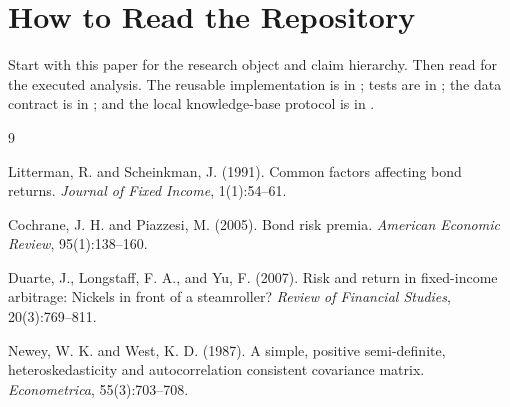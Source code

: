 \documentclass[12pt]{article}
\begin{document}
\section{How to Read the Repository}

Start with this paper for the research object and claim hierarchy. Then read
 for the executed analysis. The reusable
implementation is in ; tests are in
; the data contract is in ;
and the local knowledge-base protocol is in .

\begin{thebibliography}{9}

Litterman, R. and Scheinkman, J. (1991).
Common factors affecting bond returns.
\textit{Journal of Fixed Income}, 1(1):54--61.

Cochrane, J. H. and Piazzesi, M. (2005).
Bond risk premia.
\textit{American Economic Review}, 95(1):138--160.

Duarte, J., Longstaff, F. A., and Yu, F. (2007).
Risk and return in fixed-income arbitrage: Nickels in front of a steamroller?
\textit{Review of Financial Studies}, 20(3):769--811.

Newey, W. K. and West, K. D. (1987).
A simple, positive semi-definite, heteroskedasticity and autocorrelation consistent covariance
matrix.
\textit{Econometrica}, 55(3):703--708.

\end{thebibliography}
\end{document}
